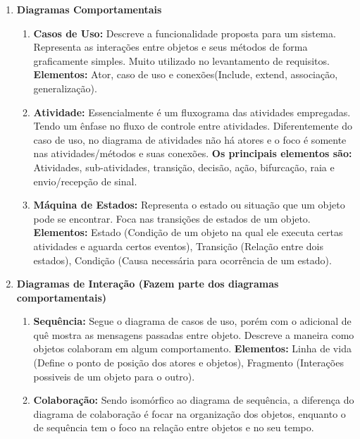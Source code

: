 \documentclass[12pt, a4paper]{article}
\begin{document}
\begin{enumerate}[label*=\textbf{\arabic*}.]
    \item \textbf{Diagramas Comportamentais}
        \begin{enumerate}[label*=\textbf{\arabic*}.]

            \item \textbf{Casos de Uso:} Descreve a funcionalidade proposta para um sistema. 
            Representa as interações entre objetos e seus métodos de forma graficamente simples.
            Muito utilizado no levantamento de requisitos. \textbf{Elementos:} Ator, caso de uso e conexões(Include, extend, associação, generalização).
            
            \item \textbf{Atividade:} Essencialmente é um fluxograma das atividades empregadas.
            Tendo um ênfase no fluxo de controle entre atividades. Diferentemente do caso de uso, no diagrama de atividades
            não há atores e o foco é somente nas atividades/métodos e suas conexões. \textbf{Os principais elementos são:}
            Atividades, sub-atividades, transição, decisão, ação, bifurcação, raia e envio/recepção de sinal. 
            
            \item \textbf{Máquina de Estados:} Representa o estado ou situação que um objeto pode se encontrar.
            Foca nas transições de estados de um objeto. \textbf{Elementos:} Estado (Condição de um objeto na qual ele 
            executa certas atividades e aguarda certos eventos), Transição (Relação entre dois estados), Condição (Causa necessária para ocorrência de um estado).
            
        \end{enumerate}
    
    \item \textbf{Diagramas de Interação (Fazem parte dos diagramas comportamentais)}
        \begin{enumerate}[label*=\textbf{\arabic*}.]

            \item \textbf{Sequência:} Segue o diagrama de casos de uso, porém com o adicional de quê mostra
            as mensagens passadas entre objeto. Descreve a maneira como objetos colaboram em algum comportamento.
            \textbf{Elementos:} Linha de vida (Define o ponto de posição dos atores e objetos), Fragmento (Interações possiveis de um objeto para o outro).
            
            \item \textbf{Colaboração:} Sendo isomórfico ao diagrama de sequência, a diferença do diagrama de colaboração
            é focar na organização dos objetos, enquanto o de sequência tem o foco na relação entre objetos e no seu tempo.
            

\end{enumerate}
\end{enumerate}
\end{document}
